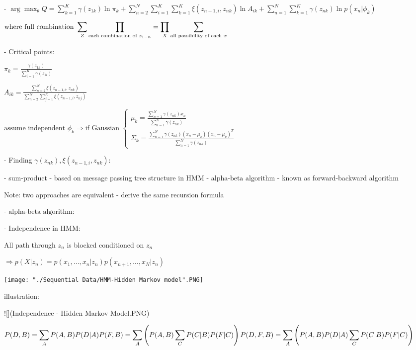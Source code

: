      - $\displaystyle \arg\max_{\theta}Q = \sum_{k=1}^K \gamma(z_{1k})\ln \pi_k + \sum_{n=2}^N\sum_{i=1}^K\sum_{k=1}^K \xi(z_{n-1,i},z_{nk})\ln A_{ik} + \sum_{n=1}^N \sum_{k=1}^K \gamma(z_{nk}) \ln p(x_n|\phi_k)$

       $\displaystyle \text{where full combination } \small \sum_{Z}\prod_{\text{each combination of }z_{1-n}} = \prod_{X}\sum_{\text{all possibility of each }x}$ 

     - Critical points:

       $\displaystyle \pi_k = \frac {\gamma(z_{1k})} {\displaystyle \sum_{i=1}^K \gamma(z_{1i})}$ 

       $\displaystyle A_{ik} = \frac {\sum_{n=2}^N \xi(z_{n-1,i},z_{nk})} {\sum_{n=2}^N \sum_{j=1}^K \xi(z_{n-1,i},z_{nj})}$ 

       $\text{assume independent } \phi_k \Rightarrow \text{if Gaussian } \begin{cases} \displaystyle \mu_k = \frac {\sum_{n=1}^N \gamma(z_{nk})x_n}{\sum_{n=1}^N \gamma(z_{nk})} \\ \displaystyle \Sigma_k = \frac{\sum_{n=1}^N \gamma(z_{nk}) (x_n-\mu_k)(x_n-\mu_k)^T}{\sum_{n=1}^N \gamma(z_{nk})} \end{cases} $ 

   - Finding $\gamma(z_{nk}),\xi(z_{n-1,i}, z_{nk})$: 

     - sum-product - based on message passing tree structure in $\text{HMM} $ 
     - $\text{alpha-beta algorithm}$ - known as forward-backward algorithm

     Note: two approaches are equivalent - derive the same recursion formula

   - $\text{alpha-beta algorithm}$: 

     - Independence in $\text{HMM}$:

       All path through $z_n$ is blocked conditioned on $z_n$  

       $\Rightarrow p(X|z_n) = p(x_1,...,x_n|z_n)p(x_{n+1},...,x_N|z_n)$

 \texttt{[image: "./Sequential Data/HMM-Hidden Markov model".PNG]}

          illustration:

          ![](Independence - Hidden Markov Model.PNG) 

          $\displaystyle P(D,B) = \sum_A P(A,B) P(D|A) \\ \displaystyle P(F,B) = \sum_A\left( P(A,B) \sum_C P(C|B)P(F|C) \right) \\ \displaystyle P(D,F,B) =\sum_A \left( P(A,B) P(D|A)\sum_C P(C|B)P(F|C) \right)$ 

